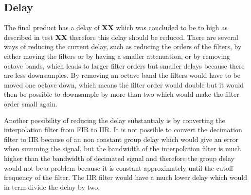 \subsection*{Delay}
The final product has a delay of \textbf{XX} which was concluded to be to high as described in test \textbf{XX} therefore this delay should be reduced. There are several ways of reducing the current delay, such as reducing the orders of the filters, by either moving the filters or by having a smaller attenuation, or by removing octave bands, which leads to larger filter orders but smaller delays because there are less downsamples. By removing an octave band the filters would have to be moved one octave down, which means the filter order would double but it would then be possible to downsample by more than two which would make the filter order small again.

Another possibility of reducing the delay substantialy is by converting the interpolation filter from FIR to IIR. It is not possible to convert the decimation filter to IIR because of an non constant group delay which would give an error when summing the signal, but the bandwidth of the interpolation filter is much higher than the bandwidth of decimated signal and therefore the group delay would not be a problem because it is constant approximately until the cutoff frequency of the filter. The IIR filter would have a much lower delay which would in term divide the delay by two.   

